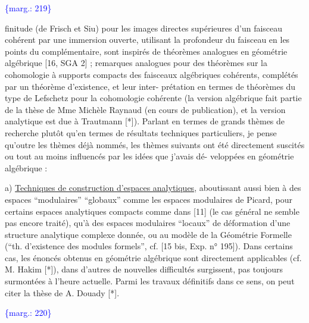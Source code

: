 \documentclass[11pt]{article}
\newcommand{\scanpage}[1]{\par\bigskip\noindent{\small\sffamily[scan #1]}\par}
\newcommand{\mspage}[1]{{\small\sffamily[p.\,#1]}}
\newcommand{\margin}[1]{\textcolor{blue}{\{\textsf{marg.:} #1\}}}
\newcommand{\uline}[1]{\underline{#1}}
\begin{document}
\margin{219}

\clearpage
\scanpage{119/220}
\mspage{. 7 .}

finitude (de Frisch et Siu) pour les images directes
supérieures d'un faisceau cohérent par une immersion
ouverte, utilisant la profondeur du faisceau en les
points du complémentaire, sont inspirés de théorèmes
analogues en géométrie algébrique [16, SGA 2] ; remarques
analogues pour des théorèmes sur la cohomologie à
supports compacts des faisceaux algébriques cohérents,
complétés par un théorème d'existence, et leur inter-%
prétation en termes de théorèmes du type de Lefschetz
pour la cohomologie cohérente (la version algébrique
fait partie de la thèse de Mme Michèle Raynaud (en cours
de publication), et la version analytique est due à
Trautmann [*]). Parlant en termes de grands thèmes de
recherche plutôt qu'en termes de résultats techniques
particuliers, je pense qu'outre les thèmes déjà nommés,
les thèmes suivants ont été directement suscités ou
tout au moins influencés par les idées que j'avais dé-%
veloppées en géométrie algébrique :

a) \uline{Techniques de construction d'espaces analytiques},
aboutissant aussi bien à des espaces ``modulaires''
``globaux'' comme les espaces modulaires de Picard, pour
certains espaces analytiques compacts comme dans [11]
(le cas général ne semble pas encore traité), qu'à des
espaces modulaires ``locaux'' de déformation d'une structure
analytique complexe donnée, ou au modèle de la Géométrie
Formelle (``th. d'existence des modules formels'',
cf. [15 bis, Exp. n° 195]). Dans certains cas, les
énoncés obtenus en géométrie algébrique sont directement
applicables (cf. M. Hakim [*]), dans d'autres de nouvelles
difficultés surgissent, pas toujours surmontées à
l'heure actuelle. Parmi les travaux définitifs dans
ce sens, on peut citer la thèse de A. Douady [*].

\margin{220}

\clearpage
\scanpage{119/221}
\mspage{. 8 .}
\end{document}
